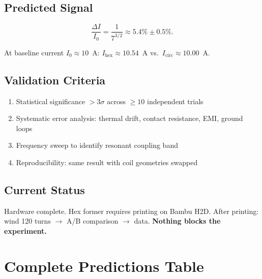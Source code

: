 \documentclass[11pt,letterpaper]{article}
\begin{document}
\subsection{Predicted Signal}

\begin{equation}
  \frac{\Delta I}{I_0} = \frac{1}{7^{3/2}} \approx 5.4\%\pm0.5\%.
\end{equation}

At baseline current $I_0 \approx 10$~A:
$I_\mathrm{hex}\approx10.54$~A vs.\ $I_\mathrm{circ}\approx10.00$~A.

\subsection{Validation Criteria}

\begin{enumerate}[nosep]
  \item Statistical significance $>3\sigma$ across $\geq10$ independent trials
  \item Systematic error analysis: thermal drift, contact resistance,
        EMI, ground loops
  \item Frequency sweep to identify resonant coupling band
  \item Reproducibility: same result with coil geometries swapped
\end{enumerate}

\subsection{Current Status}

Hardware complete.  Hex former requires printing on Bambu H2D.
After printing: wind 120 turns $\to$ A/B comparison $\to$ data.
\textbf{Nothing blocks the experiment.}

\section{Complete Predictions Table}
\end{document}
